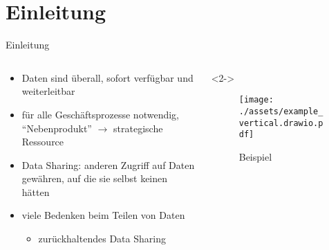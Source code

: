 
{
    \section{Einleitung}
}

\begin{frame}{Einleitung}
    \begin{columns}
        \begin{column}{0.7\textwidth}
            \begin{itemize}
                \item Daten sind überall, sofort verfügbar und weiterleitbar
                \item für alle Geschäftsprozesse notwendig,\\
                    \enquote{Nebenprodukt} $\to$ strategische Ressource~\cite{mollerIndustrialDataEcosystems2024}
                
                \item<2-> \alert{Data Sharing}: anderen Zugriff auf Daten gewähren, auf die sie selbst keinen hätten~\cite{mollerIndustrialDataEcosystems2024}
                
                \item<3-> viele Bedenken beim Teilen von Daten~\cite{mollerIndustrialDataEcosystems2024}
                \begin{itemize}
                    
                    \item<4->[$\Rightarrow$] zurückhaltendes Data Sharing
                \end{itemize}

            \end{itemize}
        \end{column}

        \begin{column}{0.3\textwidth}<2->
            \begin{figure}
                \texttt{[image: ./assets/example\_vertical.drawio.pdf]}
                \caption{Beispiel}
            \end{figure}
        \end{column}
    \end{columns}
\end{frame}


